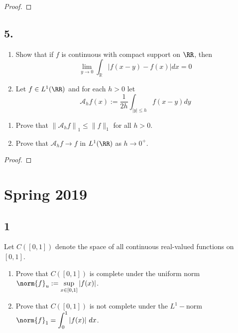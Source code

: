 \begin{proof}

\end{proof}

\hypertarget{section-4}{%
\subsection{5.}\label{section-4}}

\begin{enumerate}
\def\labelenumi{\alph{enumi}.}
\item
  Show that if \(f\) is continuous with compact support on \(\RR\), then
  \[
  \lim _{y \rightarrow 0} \int_{\mathbb{R}}|f(x-y)-f(x)| d x=0
  \]
\item
  Let \(f\in L^1(\RR)\) and for each \(h > 0\) let \[
  \mathcal{A}_{h} f(x):=\frac{1}{2 h} \int_{|y| \leq h} f(x-y) d y
  \]
\end{enumerate}

\begin{enumerate}
\def\labelenumi{\roman{enumi}.}
\setcounter{enumi}{0}
\tightlist
\item
  Prove that \(\left\|\mathcal{A}_{h} f\right\|_{1} \leq\|f\|_{1}\) for
  all \(h > 0\).
\item
  Prove that \(\mathcal{A}_h f \to f\) in \(L^1(\RR)\) as \(h \to 0^+\).
\end{enumerate}

\begin{proof}

\end{proof}

\hypertarget{spring-2019}{%
\section{Spring 2019}\label{spring-2019}}

\hypertarget{section}{%
\subsection{1}\label{section}}

Let \(C([0, 1])\) denote the space of all continuous real-valued
functions on \([0, 1]\).

\begin{enumerate}
\def\labelenumi{\alph{enumi}.}
\tightlist
\item
  Prove that \(C([0, 1])\) is complete under the uniform norm
  \(\norm{f}_u := \displaystyle\sup_{x\in [0,1]} |f (x)|\).
\item
  Prove that \(C([0, 1])\) is not complete under the \(L^1-\)norm
  \(\norm{f}_1 = \displaystyle\int_0^1 |f (x)| ~dx\).
\end{enumerate}

